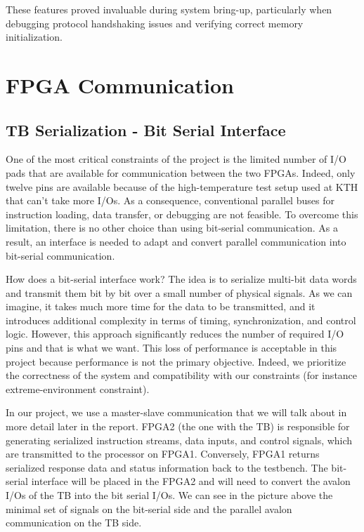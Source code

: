 \documentclass[12pt]{article}
\begin{document}
These features proved invaluable during system bring-up, particularly when debugging protocol handshaking issues and verifying correct memory initialization.

\FloatBarrier
\section{FPGA Communication} 

\subsection{TB Serialization - Bit Serial Interface}

One of the most critical constraints of the project is the limited number of I/O pads that are available for communication between the two FPGAs. Indeed, only twelve pins are available because of the high-temperature test setup used at KTH that can’t take more I/Os. As a consequence, conventional parallel buses for instruction loading, data transfer, or debugging are not feasible. To overcome this limitation, there is no other choice than using bit-serial communication. As a result, an interface is needed to adapt and convert parallel communication into bit-serial communication.

How does a bit-serial interface work? The idea is to serialize multi-bit data words and transmit them bit by bit over a small number of physical signals. As we can imagine, it takes much more time for the data to be transmitted, and it introduces additional complexity in terms of timing, synchronization, and control logic. However, this approach significantly reduces the number of required I/O pins and that is what we want. This loss of performance is acceptable in this project because performance is not the primary objective. Indeed, we prioritize the correctness of the system and compatibility with our constraints (for instance extreme-environment constraint).

In our project, we use a master-slave communication that we will talk about in more detail later in the report. FPGA2 (the one with the TB) is responsible for generating serialized instruction streams, data inputs, and control signals, which are transmitted to the processor on FPGA1. Conversely, FPGA1 returns serialized response data and status information back to the testbench. The bit-serial interface will be placed in the FPGA2 and will need to convert the avalon I/Os of the TB into the bit serial I/Os. We can see in the picture above the minimal set of signals on the bit-serial side and the parallel avalon communication on the TB side.
\end{document}
